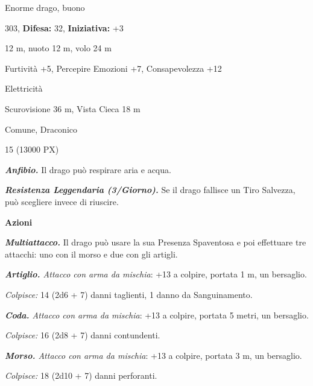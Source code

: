 \begin{multicols}{2}
{
\noindent
\begin{description}[noitemsep, topsep=0pt, parsep=0pt, partopsep=0pt, leftmargin=0cm, labelwidth=2.2cm]
	\item[\textbf{Taglia/Tipo:}] Enorme drago, buono
	\item[\textbf{Caratt.:}] 
	\item[\textbf{Punti Ferita:}] 303,  \textbf{Difesa:} 32,  \textbf{Iniziativa:} +3
	\item[\textbf{Movimento:}] 12 m, nuoto 12 m, volo 24 m
	\item[\textbf{Tiri Salvez.:}] 
	\item[\textbf{Comp.:}] Furtività +5, Percepire Emozioni +7, Consapevolezza +12
	\item[\textbf{Imm. Danni:}] Elettricità
	\item[\textbf{Sensi:}] Scurovisione 36 m, Vista Cieca 18 m
	\item[\textbf{Linguaggi:}] Comune, Draconico
	\item[\textbf{Sfida:}] 15 (13000 PX)\smallskip
\end{description}

\emph{\textbf{Anfibio.}} Il drago può respirare aria e acqua.

\emph{\textbf{Resistenza Leggendaria (3/Giorno).}} Se il drago fallisce un Tiro Salvezza, può scegliere invece di riuscire.

\textbf{Azioni}

\emph{\textbf{Multiattacco.}} Il drago può usare la sua Presenza Spaventosa e poi effettuare tre attacchi: uno con il morso e due con gli artigli.

\emph{\textbf{Artiglio.} Attacco con arma da mischia}: +13 a colpire, portata 1 m, un bersaglio.

\emph{Colpisce:} 14 (2d6 + 7) danni taglienti, 1 danno da Sanguinamento.

\emph{\textbf{Coda.} Attacco con arma da mischia}: +13 a colpire, portata 5 metri, un bersaglio.

\emph{Colpisce:} 16 (2d8 + 7) danni contundenti.

\emph{\textbf{Morso.} Attacco con arma da mischia}: +13 a colpire, portata 3 m, un bersaglio.

\emph{Colpisce:} 18 (2d10 + 7) danni perforanti.

}
\end{multicols}
